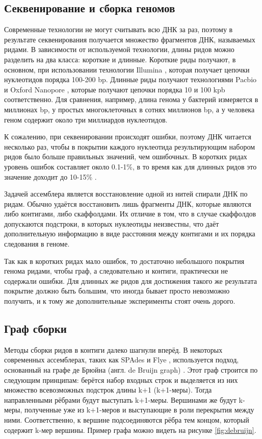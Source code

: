 \documentclass[14pt]{matmex-diploma-custom}
\begin{document}
\subsection{Секвенирование и сборка геномов}
Современные технологии не могут считывать всю ДНК за раз, поэтому в результате секвенирования получается множество фрагментов ДНК, называемых ридами. В зависимости от используемой технологии, длины ридов можно разделить на два класса: короткие и длинные. Короткие риды получают, в основном, при использовании технологии Illumina \cite{art:reads}, которая получает цепочки нуклеотидов порядка 100-200 bp. Длинные риды получают технологиями Pacbio и Oxford Nanopore \cite{art:reads}, которые получают цепочки порядка 10 и 100 kpb соответственно. Для сравнения, например, длина генома у бактерий измеряется в миллионах bp, у простых многоклеточных в сотнях миллионов bp, а у человека геном содержит около три миллиардов нуклеотидов.

К сожалению, при секвенировании происходят ошибки, поэтому ДНК читается несколько раз, чтобы в покрытии каждого нуклеотида результирующим набором ридов было больше правильных значений, чем ошибочных. В коротких ридах уровень ошибок составляет около 0.1-1\%, в то время как для длинных ридов это значение доходит до 10-15\% \cite{art:reads}.

Задачей ассемблера является восстановление одной из нитей спирали ДНК по ридам. Обычно удаётся  восстановить лишь фрагменты ДНК, которые являются либо контигами, либо скаффолдами. Их отличие в том, что в случае скаффолдов допускаются подстроки, в которых нуклеотиды неизвестны, что даёт дополнительную информацию в виде расстояния между контигами и их порядка следования в геноме.

Так как в коротких ридах мало ошибок, то достаточно небольшого покрытия генома ридами, чтобы граф, а следовательно и контиги, практически не содержали ошибки. Для длинных же ридов для достижения такого же результата покрытие должно быть большим, что иногда бывает просто невозможно получить, и к тому же дополнительные эксперименты стоят очень дорого.

\subsection{Граф сборки}
Методы сборки ридов в контиги далеко шагнули вперёд. В некоторых современных ассемблерах, таких как SPAdes \cite{art:SPAdes} и Flye \cite{art:flye}, используется подход, основанный на графе де Брюйна (англ. de Bruijn graph) \cite{art:Pevzner}. Этот граф строится по следующим принципам: берётся набор входных строк и выделяется из них множество всевозможных подстрок длины k+1 (k+1-меры). Тогда направленными рёбрами будут выступать k+1-меры. Вершинами же будут k-меры, полученные уже из k+1-меров и выступающие в роли перекрытия между ними. Соответственно, к вершине подсоединяются рёбра тем концом, который содержит k-мер вершины. Пример графа можно видеть на рисунке \ref{fig:debruijn}.
\end{document}
